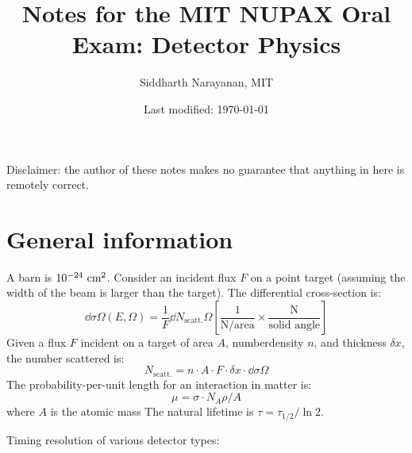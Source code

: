 

\pagestyle{fancy}
\chead{\today}
\setcounter{section}{-1}


\title{Notes for the MIT NUPAX Oral Exam: Detector Physics}
\date{Last modified: \today}
\author{Siddharth Narayanan, MIT}

\maketitle

\vspace{20mm}
\centering
Disclaimer: the author of these notes makes no guarantee that anything in here is remotely correct. 

\clearpage
\tableofcontents
\clearpage


\section{General information}

A barn is $10^{-24}~\text{cm}^2$. Consider an incident flux $F$ on a point target (assuming the width of the beam is larger than the target). The differential cross-section is:
\begin{equation}
  \dd{\sigma}{\Omega}(E,\Omega) = \frac{1}{F} \dd{N_\text{scatt.}}{\Omega} \left[\frac{1}{\text{N/area}} \times \frac{\text{N}}{\text{solid angle}}\right]
\end{equation}
Given a flux $F$ incident on a target of area $A$, numberdensity $n$, and thickness $\delta x$, the number scattered is:
\begin{equation}
  N_\text{scatt.} = n\cdot A\cdot F\cdot \delta x \cdot \dd\sigma\Omega
\end{equation}
The probability-per-unit length for an interaction in matter is:
\begin{equation}
  \mu = \sigma\cdot N_A\rho/A
\end{equation}
where $A$ is the atomic mass
\noindent The natural lifetime is $\tau = \tau_{1/2}/\ln 2$.

\noindent Timing resolution of various detector types:

